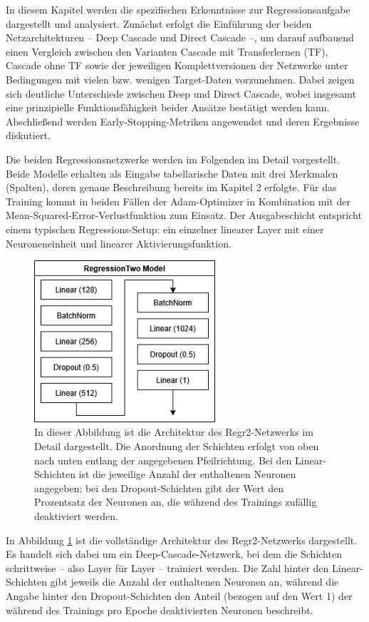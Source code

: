 In diesem Kapitel werden die spezifischen Erkenntnisse zur Regressionsaufgabe dargestellt und analysiert. Zunächst erfolgt die Einführung der 
beiden Netzarchitekturen – Deep Cascade und Direct Cascade –, um darauf aufbauend einen Vergleich zwischen den Varianten Cascade mit 
Transferlernen (TF), Cascade ohne TF sowie der jeweiligen Komplettversionen der Netzwerke unter Bedingungen mit vielen bzw. wenigen Target-Daten 
vorzunehmen. Dabei zeigen sich deutliche Unterschiede zwischen Deep und Direct Cascade, wobei insgesamt eine prinzipielle Funktionsfähigkeit 
beider Ansätze bestätigt werden kann. Abschließend werden Early-Stopping-Metriken angewendet und deren Ergebnisse diskutiert.

Die beiden Regressionsnetzwerke werden im Folgenden im Detail vorgestellt. Beide Modelle erhalten als Eingabe tabellarische Daten mit drei 
Merkmalen (Spalten), deren genaue Beschreibung bereits im Kapitel 2 erfolgte. Für das Training kommt in beiden Fällen der 
Adam-Optimizer in Kombination mit der Mean-Squared-Error-Verlustfunktion zum Einsatz. Der Ausgabeschicht entspricht einem typischen 
Regressions-Setup: ein einzelner linearer Layer mit einer Neuroneneinheit und linearer Aktivierungsfunktion.

\begin{figure}[htpb]
    \centering
    \includegraphics[height=6cm]{../../Graphiken/regressiontwo_2.png}
    \caption{\label{fig:regr2} 
    \small{In dieser Abbildung ist die Architektur des Regr2-Netzwerks im Detail dargestellt. Die Anordnung der Schichten erfolgt von oben nach 
    unten entlang der angegebenen Pfeilrichtung. Bei den Linear-Schichten ist die jeweilige Anzahl der enthaltenen Neuronen angegeben; bei den 
    Dropout-Schichten gibt der Wert den Prozentsatz der Neuronen an, die während des Trainings zufällig deaktiviert werden.}}
\end{figure}

In Abbildung \ref{fig:regr2} ist die vollständige Architektur des Regr2-Netzwerks dargestellt. Es handelt sich dabei um ein Deep-Cascade-Netzwerk, 
bei dem die Schichten schrittweise – also Layer für Layer – trainiert werden. Die Zahl hinter den Linear-Schichten gibt jeweils die Anzahl der 
enthaltenen Neuronen an, während die Angabe hinter den Dropout-Schichten den Anteil (bezogen auf den Wert 1) der während des Trainings pro 
Epoche deaktivierten Neuronen beschreibt.

